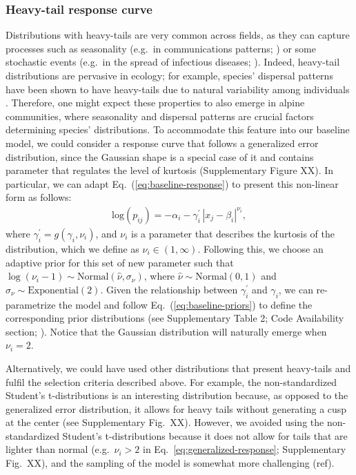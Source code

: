 \documentclass[11pt, a4paper]{article}
\begin{document}
\subsubsection*{Heavy-tail response curve}
Distributions with heavy-tails are very common across fields, as they can capture processes such as seasonality (e.g.~in communications patterns; \citealt{malmgrenPoissonianExplanationHeavy2008}) or some stochastic events (e.g.~in the spread of infectious diseases; \citealt{wongEvidenceThatCoronavirus2020}). Indeed, heavy-tail distributions are pervasive in ecology; for example, species' dispersal patterns have been shown to have heavy-tails due to natural variability among individuals \citep{petrovskiiDispersalStatisticallyStructured2009}. Therefore, one might expect these properties to also emerge in alpine communities, where seasonality and dispersal patterns are crucial factors determining species' distributions. To accommodate this feature into our baseline model, we could consider a response curve that follows a generalized error distribution, since the Gaussian shape is a special case of it and contains parameter that regulates the level of kurtosis (Supplementary Figure XX). In particular, we can adapt Eq.~(\ref{eq:baseline-response}) to present this non-linear form as follows:
\begin{equation}
\begin{split}
\text{log}\left(p_{ij}\right) = -\alpha_{i} - \gamma^{\prime}_{i}\, |x_{j}-\beta_{i}|^{\nu_{i}} ,
\end{split}
\label{eq:generalized-response}
\end{equation}
where $\gamma^{\prime}_{i} = g(\gamma_{i}, \nu_{i})$, and $\nu_{i}$ is a parameter that describes the kurtosis of the distribution, which we define as $\nu_{i}\in\left(1, \infty\right)$. Following this, we choose an adaptive prior for this set of new parameter such that $\log\left(\nu_{i}-1\right)\sim \text{Normal}\left(\hat{\nu}, \sigma_{\nu}\right)$, where $\hat{\nu}\sim\text{Normal}\left(0, 1\right)$ and $\sigma_{\nu}\sim\text{Exponential}\left(2\right)$. Given the relationship between $\gamma^{\prime}_{i}$ and $\gamma_{i}$,  we can re-parametrize the model and follow Eq.~(\ref{eq:baseline-priors}) to define the corresponding prior distributions (see Supplementary Table 2; Code Availability section; \citealt{nadarajahGeneralizedNormalDistribution2005}). Notice that the Gaussian distribution will naturally emerge when $\nu_i=2$.

Alternatively, we could have used other distributions that present heavy-tails and fulfil the selection criteria described above. For example, the non-standardized Student's t-distributions is an interesting distribution because, as opposed to the generalized error distribution, it allows for heavy tails without generating a cusp at the center (see Supplementary Fig.~XX). However, we avoided using the non-standardized Student's t-distributions because it does not allow for tails that are lighter than normal (e.g.~$\nu_i>2$ in Eq.~\ref{eq:generalized-response}; Supplementary Fig.~XX), and the sampling of the model is somewhat more challenging (ref). 
\end{document}
